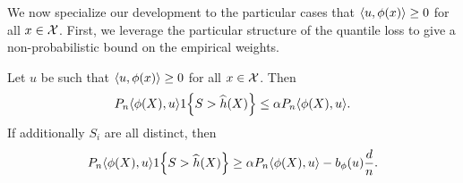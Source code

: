 \documentclass{article}
\newcommand{\radphi}{b_{\phi}}
\newcommand{\scorerv}{S}
\begin{document}
We now specialize our development to the particular
cases that $\langle u, \phi(x)\rangle \ge 0$ for all $x \in
\mathcal{X}$.
%
First, we leverage the particular structure of the quantile
loss to give a non-probabilistic bound on the empirical
weights.
\begin{lemma}
  \label{lemma:one-directional-coverageish}
  Let $u$ be such that $\langle u, \phi(x)\rangle \ge 0$ for all $x \in \mathcal{X}$.
  Then
  \begin{equation*}
    P_n \<\phi(X), u\> \indic{\scorerv > \what{h}(X)}
    \le \alpha P_n \<\phi(X), u\>.
  \end{equation*}
  If additionally $\scorerv_i$ are all distinct, then
  \begin{equation*}
    P_n \<\phi(X), u\> \indic{\scorerv > \what{h}(X)}
    \ge \alpha P_n \<\phi(X), u\> - \radphi(u) \frac{d}{n}.
  \end{equation*}
\end{lemma}
\end{document}
